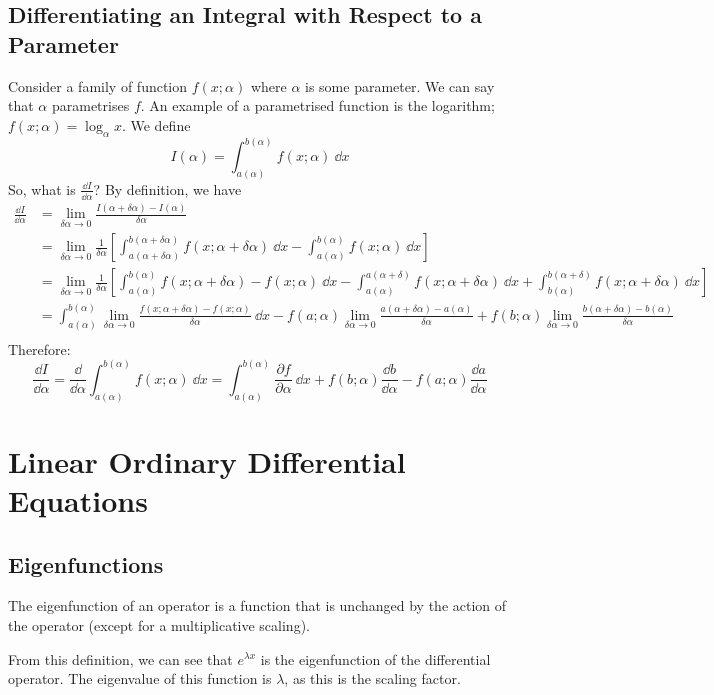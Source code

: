 \documentclass{article}
\begin{document}
	\subsection{Differentiating an Integral with Respect to a Parameter}
	Consider a family of function $f(x; \alpha)$ where $\alpha$ is some parameter. We can say that $\alpha$ parametrises $f$. An example of a parametrised function is the logarithm; $f(x; \alpha) = \log_\alpha x$. We define
	\[ I(\alpha) = \int_{a(\alpha)}^{b(\alpha)} f(x; \alpha) \ \dd x \]
	So, what is $\frac{\dd I}{\dd \alpha}$? By definition, we have
	\begin{align*}
		\frac{\dd I}{\dd \alpha} &= \lim_{\delta \alpha \to 0} \frac{I(\alpha + \delta \alpha) - I(\alpha)}{\delta \alpha} \\
		&= \lim_{\delta \alpha \to 0} \frac{1}{\delta\alpha} \left[ \int_{a(\alpha + \delta\alpha)}^{b(\alpha + \delta\alpha)} f(x; \alpha + \delta\alpha)\ \dd x - \int_{a(\alpha)}^{b(\alpha)} f(x; \alpha)\ \dd x \right] \\
		&= \lim_{\delta \alpha \to 0} \frac{1}{\delta\alpha} \left[ \int_{a(\alpha)}^{b(\alpha)} f(x; \alpha + \delta\alpha) - f(x; \alpha)\ \dd x - \int_{a(\alpha)}^{a(\alpha + \delta)} f(x; \alpha + \delta \alpha)\ \dd x + \int_{b(\alpha)}^{b(\alpha + \delta)} f(x; \alpha + \delta \alpha)\ \dd x \right] \\
		&= \int_{a(\alpha)}^{b(\alpha)} \lim_{\delta \alpha \to 0} \frac{f(x; \alpha + \delta\alpha) - f(x; \alpha)}{\delta\alpha}\ \dd x - f(a; \alpha) \lim_{\delta \alpha \to 0} \frac{a(\alpha + \delta\alpha) - a(\alpha)}{\delta\alpha} + f(b; \alpha) \lim_{\delta \alpha \to 0} \frac{b(\alpha + \delta\alpha) - b(\alpha)}{\delta\alpha} \\
	\end{align*}
	Therefore:
	\[ \frac{\dd I}{\dd \alpha} = \frac{\dd}{\dd \alpha} \int_{a(\alpha)}^{b(\alpha)} f(x; \alpha) \ \dd x = \int_{a(\alpha)}^{b(\alpha)} \frac{\partial f}{\partial \alpha} \ \dd x + f(b; \alpha) \frac{\dd b}{\dd \alpha} - f(a; \alpha) \frac{\dd a}{\dd \alpha} \]
	
	\section{Linear Ordinary Differential Equations}
	\subsection{Eigenfunctions}
	\begin{definition}
		The eigenfunction of an operator is a function that is unchanged by the action of the operator (except for a multiplicative scaling).
	\end{definition}
	From this definition, we can see that $e^{\lambda x}$ is the eigenfunction of the differential operator. The eigenvalue of this function is $\lambda$, as this is the scaling factor.
	
\end{document}
